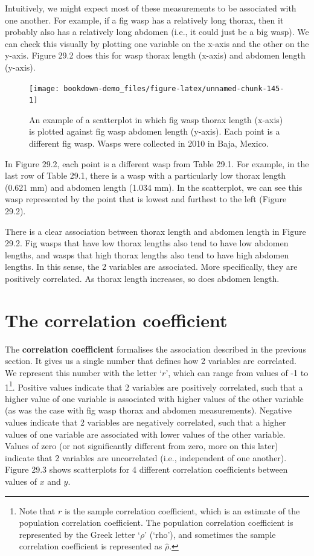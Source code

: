 \documentclass[
]{scrbook}
\begin{document}
Intuitively, we might expect most of these measurements to be associated with one another.
For example, if a fig wasp has a relatively long thorax, then it probably also has a relatively long abdomen (i.e., it could just be a big wasp).
We can check this visually by plotting one variable on the x-axis and the other on the y-axis.
Figure 29.2 does this for wasp thorax length (x-axis) and abdomen length (y-axis).

\begin{figure}
\texttt{[image: bookdown-demo\_files/figure-latex/unnamed-chunk-145-1]} \caption{An example of a scatterplot in which fig wasp thorax length (x-axis) is plotted against fig wasp abdomen length (y-axis). Each point is a different fig wasp. Wasps were collected in 2010 in Baja, Mexico.}\label{fig:unnamed-chunk-145}
\end{figure}

In Figure 29.2, each point is a different wasp from Table 29.1.
For example, in the last row of Table 29.1, there is a wasp with a particularly low thorax length (0.621 mm) and abdomen length (1.034 mm).
In the scatterplot, we can see this wasp represented by the point that is lowest and furthest to the left (Figure 29.2).

There is a clear association between thorax length and abdomen length in Figure 29.2.
Fig wasps that have low thorax lengths also tend to have low abdomen lengths, and wasps that high thorax lengths also tend to have high abdomen lengths.
In this sense, the 2 variables are associated.
More specifically, they are positively correlated.
As thorax length increases, so does abdomen length.

\hypertarget{the-correlation-coefficient}{%
\section{The correlation coefficient}\label{the-correlation-coefficient}}

The \textbf{correlation coefficient} formalises the association described in the previous section.
It gives us a single number that defines how 2 variables are correlated.
We represent this number with the letter `\(r\)', which can range from values of -1 to 1\footnote{Note that \(r\) is the sample correlation coefficient, which is an estimate of the population correlation coefficient. The population correlation coefficient is represented by the Greek letter `\(\rho\)' (`rho'), and sometimes the sample correlation coefficient is represented as \(\hat{\rho}\).}.
Positive values indicate that 2 variables are positively correlated, such that a higher value of one variable is associated with higher values of the other variable (as was the case with fig wasp thorax and abdomen measurements).
Negative values indicate that 2 variables are negatively correlated, such that a higher values of one variable are associated with lower values of the other variable.
Values of zero (or not significantly different from zero, more on this later) indicate that 2 variables are uncorrelated (i.e., independent of one another).
Figure 29.3 shows scatterplots for 4 different correlation coefficients between values of \(x\) and \(y\).
\end{document}
